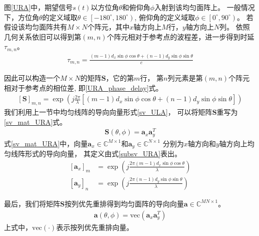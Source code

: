 \documentclass[master]{thesis-uestc}
\begin{document}
图\ref{URA}中，期望信号$s(t)$以方位角$\theta$和俯仰角$\phi$入射到该均匀面阵上。
一般情况下，方位角$\theta$的定义域取$\theta\in\left[-180^\circ,180^\circ\right)$,
俯仰角的定义域取$\phi\in\left[0^\circ,90^\circ\right)$。
若假设该均匀面阵共有$M \times N$个阵元，其中$x$轴方向上$M$行，$y$轴方向上$N$列。
依照几何关系依旧可以得到第$(m,n)$个阵元相对于参考点的波程差，进一步得到时延$\tau_{m,n}$。
\begin{equation}\label{URA_time_delay}
    \begin{aligned}
        \tau_{m,n} = 
        \frac{(m-1)d_x\sin\phi\cos\theta + (n-1)d_y\sin\phi\sin\theta}{c}
    \end{aligned}
\end{equation}

因此可以构造一个$M \times N$的矩阵$\bm{S}$，它的第$m$行，
第$n$列元素是第$(m,n)$个阵元相对于参考点的相位差,
即\eqref{URA_phase_delay}式。
\begin{equation}\label{URA_phase_delay}
    \begin{aligned}
        \left[\bm{S}\right]_{m,n} = 
        \exp\left(j\frac{2\pi}{\lambda}
                  \left[(m-1)d_x\sin\phi\cos\theta + (n-1)d_y\sin\phi\sin\theta\right]\right)
    \end{aligned}
\end{equation}
我们利用上一节中均匀线阵的导向向量形式\eqref{sv_ULA}，
可以将矩阵$\bm{S}$重写为\eqref{sv_mat_URA}式。
\begin{equation}\label{sv_mat_URA}
    \begin{aligned}
        \bm{S}(\theta,\phi) = \bm{a}_x\bm{a}^T_y
    \end{aligned}
\end{equation}
式\eqref{sv_mat_URA}中，向量$\bm{a}_x\in\mathbb{C}^{M\times1}$和$\bm{a}_y\in\mathbb{C}^{N\times1}$
分别为$x$轴方向和$y$轴方向上均匀线阵形式的导向向量，
其定义由式\eqref{subsv_URA}表出。
\begin{subequations}\label{subsv_URA}
    \begin{align}
        \left[\bm{a}_x\right]_{m} &= 
        \exp\left(j\frac{2\pi(m-1)d_x\sin\phi\cos\theta}{\lambda}\right)
        \\
        \left[\bm{a}_y\right]_{n} &= 
        \exp\left(j\frac{2\pi(n-1)d_y\sin\phi\sin\theta}{\lambda}\right)
    \end{align}
\end{subequations}

最后，我们将矩阵$\bm{S}$按列优先重排得到均匀面阵的导向向量$\bm{a}\in\mathbb{C}^{MN\times1}$。
\begin{equation}\label{sv_URA}
    \begin{aligned}
        \bm{a}(\theta,\phi) = \text{vec}\left(\bm{a}_x\bm{a}_y^T\right)
    \end{aligned}
\end{equation}
上式中，$\text{vec}(\cdot)$表示按列优先重排向量。
\end{document}
